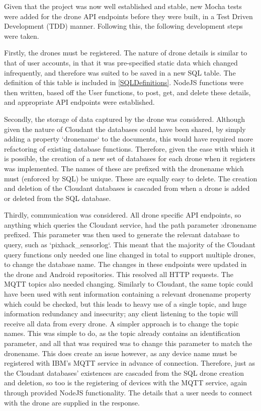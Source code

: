 \documentclass{article}
\begin{document}
Given that the project was now well established and stable, new Mocha tests were added for the drone API endpoints before they were built, in a Test Driven Development (TDD) manner. Following this, the following development steps were taken. 

Firstly, the drones must be registered. The nature of drone details is similar to that of user accounts, in that it was pre-specified static data which changed infrequently, and therefore was suited to be saved in a new SQL table. The definition of this table is included in \ref{SQLDefinitions}. NodeJS functions were then written, based off the User functions, to post, get, and delete these details, and appropriate API endpoints were established. 

Secondly, the storage of data captured by the drone was considered. Although given the nature of Cloudant the databases could have been shared, by simply adding a property `dronename` to the documents, this would have required more refactoring of existing database functions. Therefore, given the ease with which it is possible, the creation of a new set of databases for each drone when it registers was implemented. The names of these are prefixed with the dronename which must (enforced by SQL) be unique. These are equally easy to delete. The creation and deletion of the Cloudant databases is cascaded from when a drone is added or deleted from the SQL database. 

Thirdly, communication was considered. All drone specific API endpoints, so anything which queries the Cloudant service, had the path parameter :dronename prefixed. This parameter was then used to generate the relevant database to query, such as `pixhack\_sensorlog`. This meant that the majority of the Cloudant query functions only needed one line changed in total to support multiple drones, to change the database name. The changes in these endpoints were updated in the drone and Android repositories. This resolved all HTTP requests. The MQTT topics also needed changing. Similarly to Cloudant, the same topic could have been used with sent information containing a relevant dronename property which could be checked, but this leads to heavy use of a single topic, and huge information redundancy and insecurity; any client listening to the topic will receive all data from every drone. A simpler approach is to change the topic names. This was simple to do, as the topic already contains an identification parameter, and all that was required was to change this parameter to match the dronename. This does create an issue however, as any device name must be registered with IBM's MQTT service in advance of connection. Therefore, just as the Cloudant databases' existences are cascaded from the SQL drone creation and deletion, so too is the registering of devices with the MQTT service, again through provided NodeJS functionality. The details that a user needs to connect with the drone are supplied in the response.
\end{document}
